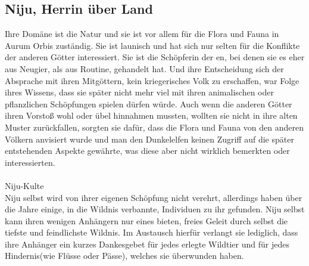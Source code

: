 \documentclass[a4paper,12pt,oneside]{book}
\begin{document}
\subsection{Niju, Herrin über Land}\label{Niju}
Ihre Domäne ist die Natur und sie ist vor allem für die Flora und Fauna in Aurum Orbis zuständig. Sie ist launisch und hat sich nur selten für die Konflikte der anderen Götter interessiert. Sie ist die Schöpferin der en, bei denen sie es eher aus Neugier, als aus Routine, gehandelt hat. Und ihre Entscheidung sich der Absprache mit ihren Mitgöttern, kein kriegerisches Volk zu erschaffen, war Folge ihres Wissens, dass sie später nicht mehr viel mit ihren animalischen oder pflanzlichen Schöpfungen spielen dürfen würde. Auch wenn die anderen Götter ihren Vorstoß wohl oder übel hinnahmen mussten, wollten sie nicht in ihre alten Muster zurückfallen, sorgten sie dafür, dass die Flora und Fauna von den anderen Völkern anvisiert wurde und man den Dunkelelfen keinen Zugriff auf die später entstehenden Aspekte gewährte, was diese aber nicht wirklich bemerkten oder interessierten.
\\\\\large Niju-Kulte
\\\normalsize Niju selbst wird von ihrer eigenen Schöpfung nicht verehrt, allerdings haben über die Jahre einige, in die Wildnis verbannte, Individuen zu ihr gefunden. Niju selbst kann ihren wenigen Anhängern nur eines bieten, freies Geleit durch selbst die tiefste und feindlichste Wildnis. Im Austausch hierfür verlangt sie lediglich, dass ihre Anhänger ein kurzes Dankesgebet für jedes erlegte Wildtier und für jedes Hindernis(wie Flüsse oder Pässe), welches sie überwunden haben.
\end{document}
